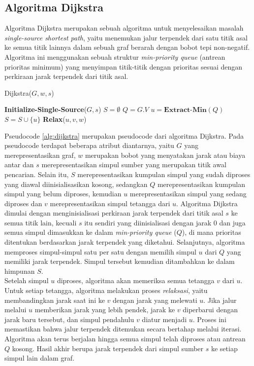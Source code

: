 \subsection{Algoritma Dijkstra ~\cite{Cormen:09:intro}}
\label{sec:dijkstra}
Algoritma Dijkstra merupakan sebuah algoritma untuk menyelesaikan masalah \textit{single-source shortest path}, yaitu menemukan jalur terpendek dari satu titik asal ke semua titik lainnya dalam sebuah graf berarah dengan bobot tepi non-negatif. Algoritma ini menggunakan sebuah struktur \textit{min-priority queue} (antrean prioritas minimum) yang menyimpan titik-titik dengan prioritas sesuai dengan perkiraan jarak terpendek dari titik asal.
\begin{algorithm}[H]
    \caption{Dijkstra($G, w, s$)}
    \label{alg:dijkstra}
    \begin{algorithmic}[1]
    \State \textbf{Initialize-Single-Source}($G, s$)
    \State $S = \emptyset$
    \State $Q = G.V$
        \State $u = \textbf{Extract-Min}(Q)$
        \State $S = S \cup \{u\}$
            \State \textbf{Relax}($u, v, w$)
        \EndFor
    \EndWhile
    \end{algorithmic}
\end{algorithm}
\noindent
Pseudocode \ref{alg:dijkstra} merupakan pseudocode dari algoritma Dijkstra. Pada pseudocode terdapat beberapa atribut diantarnya, yaitu $G$ yang merepresentasikan graf, $w$ merupakan bobot yang menyatakan jarak atau biaya antar dan $s$ merepresentasikan simpul sumber yang merupakan titik awal pencarian. Selain itu, $S$ merepresentasikan kumpulan simpul yang sudah diproses yang diawal diinisialisasikan kosong, sedangkan $Q$ merepresentasikan kumpulan simpul yang belum diproses, kemudian $u$ merepresentasikan simpul yang sedang diproses dan $v$ merepresentasikan simpul tetangga dari $u$. Algoritma Dijkstra dimulai dengan menginisialisasi perkiraan jarak terpendek dari titik asal $s$ ke semua titik lain, kecuali $s$ itu sendiri yang diinisialisasi dengan jarak 0 dan juga semua simpul dimasukkan ke dalam \textit{min-priority queue} ($Q$), di mana prioritas ditentukan berdasarkan jarak terpendek yang diketahui. Selanjutnya, algoritma memproses simpul-simpul satu per satu dengan memilih simpul $u$ dari $Q$ yang memiliki jarak terpendek. Simpul tersebut kemudian ditambahkan ke dalam himpunan $S$.
\\
Setelah simpul $u$ diproses, algoritma akan memeriksa semua tetangga $v$ dari $u$. Untuk setiap tetangga, algoritma melakukan proses \textit{relaksasi}, yaitu membandingkan jarak saat ini ke $v$ dengan jarak yang melewati $u$. Jika jalur melalui $u$ memberikan jarak yang lebih pendek, jarak ke $v$ diperbarui dengan jarak baru tersebut, dan simpul pendahulu $v$ diatur menjadi $u$. Proses ini memastikan bahwa jalur terpendek ditemukan secara bertahap melalui iterasi. Algoritma akan terus berjalan hingga semua simpul telah diproses atau antrean $Q$ kosong. Hasil akhir berupa jarak terpendek dari simpul sumber $s$ ke setiap simpul lain dalam graf.
